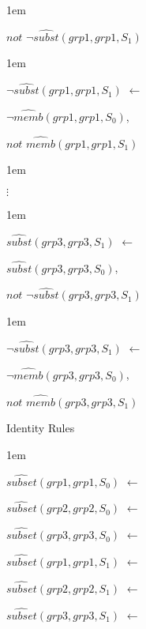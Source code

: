 \documentclass[global,twocolumn,final]{svjour}
\newenvironment{vquote}
  {\begin{list}{}{\leftmargin 1em}\item[]}
  {\end{list}}
\begin{document}
\begin{enumerate}
\begin{vquote}
           \hspace{1em}
           $not$ $\lnot\hat{subst}(grp1, grp1, S_{1})$
         \end{vquote}

         \begin{vquote}
           $\lnot\hat{subst}(grp1, grp1, S_{1})$ $\leftarrow$

           \hspace{1em}
           $\lnot\hat{memb}(grp1, grp1, S_{0})$,

           \hspace{1em}
           $not$ $\hat{memb}(grp1, grp1, S_{1})$
         \end{vquote}

         \begin{vquote}
           \hspace{2em}$\vdots$
         \end{vquote}

         \begin{vquote}
           $\hat{subst}(grp3, grp3, S_{1})$ $\leftarrow$

           \hspace{1em}
           $\hat{subst}(grp3, grp3, S_{0})$,

           \hspace{1em}
           $not$ $\lnot\hat{subst}(grp3, grp3, S_{1})$
         \end{vquote}

         \begin{vquote}
           $\lnot\hat{subst}(grp3, grp3, S_{1})$ $\leftarrow$

           \hspace{1em}
           $\lnot\hat{memb}(grp3, grp3, S_{0})$,

           \hspace{1em}
           $not$ $\hat{memb}(grp3, grp3, S_{1})$
         \end{vquote}
       \item
         Identity Rules

         \begin{vquote}
           $\hat{subset}(grp1, grp1, S_{0})$ $\leftarrow$

           $\hat{subset}(grp2, grp2, S_{0})$ $\leftarrow$

           $\hat{subset}(grp3, grp3, S_{0})$ $\leftarrow$

           $\hat{subset}(grp1, grp1, S_{1})$ $\leftarrow$

           $\hat{subset}(grp2, grp2, S_{1})$ $\leftarrow$

           $\hat{subset}(grp3, grp3, S_{1})$ $\leftarrow$
         \end{vquote}
     \end{enumerate}
\end{document}
